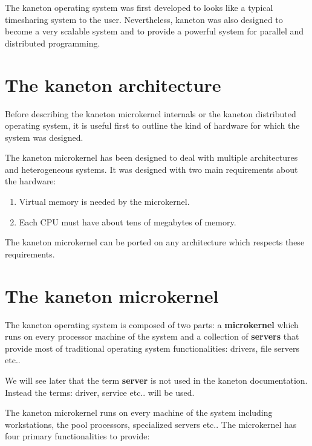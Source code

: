 \documentclass[10pt,a4wide]{article}
\begin{document}
\begin{multicols}{2}
The kaneton operating system was first developed to looks like a typical
timesharing system to the user. Nevertheless, kaneton was also designed to
become a very scalable system and to provide a powerful system for
parallel and distributed programming.



\section{The kaneton architecture}

Before describing the kaneton microkernel internals or the kaneton distributed
operating system, it is useful first to outline the kind of hardware for
which the system was designed.

The kaneton microkernel has been designed to deal with multiple architectures
and heterogeneous systems. It was designed with two main requirements about the
hardware:

\begin{enumerate}

\item Virtual memory is needed by the microkernel.
\item Each CPU must have about tens of megabytes of memory.

\end{enumerate}

The kaneton microkernel can be ported on any architecture which respects these
requirements.



\section{The kaneton microkernel}

The kaneton operating system is composed of two parts: a \textbf{microkernel}
which runs on every processor machine of the system and a collection of
\textbf{servers} that provide most of traditional operating system
functionalities: drivers, file servers etc..

We will see later that the term \textbf{server} is not used in the kaneton
documentation. Instead the terms: driver, service etc.. will be used.

The kaneton microkernel runs on every machine of the system including
workstations, the pool processors, specialized servers etc.. The microkernel
has four primary functionalities to provide:

\begin{enumerate}


\end{enumerate}
\end{multicols}
\end{document}
